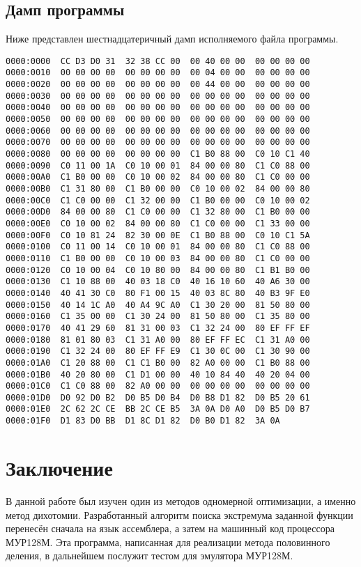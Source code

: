 \documentclass[14pt]{report}
\begin{document}
\section{Дамп программы}
Ниже представлен шестнадцатеричный дамп исполняемого файла программы.
\begin{verbatim}
0000:0000  CC D3 D0 31  32 38 CC 00  00 40 00 00  00 00 00 00
0000:0010  00 00 00 00  00 00 00 00  00 04 00 00  00 00 00 00
0000:0020  00 00 00 00  00 00 00 00  00 44 00 00  00 00 00 00
0000:0030  00 00 00 00  00 00 00 00  00 00 00 00  00 00 00 00
0000:0040  00 00 00 00  00 00 00 00  00 00 00 00  00 00 00 00
0000:0050  00 00 00 00  00 00 00 00  00 00 00 00  00 00 00 00
0000:0060  00 00 00 00  00 00 00 00  00 00 00 00  00 00 00 00
0000:0070  00 00 00 00  00 00 00 00  00 00 00 00  00 00 00 00
0000:0080  00 00 00 00  00 00 00 00  C1 B0 88 00  C0 10 C1 40
0000:0090  C0 11 00 1A  C0 10 00 01  84 00 00 80  C1 C0 88 00
0000:00A0  C1 B0 00 00  C0 10 00 02  84 00 00 80  C1 C0 00 00
0000:00B0  C1 31 80 00  C1 B0 00 00  C0 10 00 02  84 00 00 80
0000:00C0  C1 C0 00 00  C1 32 00 00  C1 B0 00 00  C0 10 00 02
0000:00D0  84 00 00 80  C1 C0 00 00  C1 32 80 00  C1 B0 00 00
0000:00E0  C0 10 00 02  84 00 00 80  C1 C0 00 00  C1 33 00 00
0000:00F0  C0 10 81 24  82 30 00 0E  C1 B0 88 00  C0 10 C1 5A
0000:0100  C0 11 00 14  C0 10 00 01  84 00 00 80  C1 C0 88 00
0000:0110  C1 B0 00 00  C0 10 00 03  84 00 00 80  C1 C0 00 00
0000:0120  C0 10 00 04  C0 10 80 00  84 00 00 80  C1 B1 B0 00
0000:0130  C1 10 88 00  40 03 18 C0  40 16 10 60  40 A6 30 00
0000:0140  40 41 30 C0  80 F1 00 15  40 03 8C 80  40 B3 9F E0
0000:0150  40 14 1C A0  40 A4 9C A0  C1 30 20 00  81 50 80 00
0000:0160  C1 35 00 00  C1 30 24 00  81 50 80 00  C1 35 80 00
0000:0170  40 41 29 60  81 31 00 03  C1 32 24 00  80 EF FF EF
0000:0180  81 01 80 03  C1 31 A0 00  80 EF FF EC  C1 31 A0 00
0000:0190  C1 32 24 00  80 EF FF E9  C1 30 0C 00  C1 30 90 00
0000:01A0  C1 20 88 00  C1 C1 B0 00  82 A0 00 00  C1 B0 88 00
0000:01B0  40 20 80 00  C1 D1 00 00  40 10 84 40  40 20 04 00
0000:01C0  C1 C0 88 00  82 A0 00 00  00 00 00 00  00 00 00 00
0000:01D0  D0 92 D0 B2  D0 B5 D0 B4  D0 B8 D1 82  D0 B5 20 61
0000:01E0  2C 62 2C CE  BB 2C CE B5  3A 0A D0 A0  D0 B5 D0 B7
0000:01F0  D1 83 D0 BB  D1 8C D1 82  D0 B0 D1 82  3A 0A
\end{verbatim}
\chapter*{Заключение}
В данной работе был изучен один из методов одномерной оптимизации, а именно метод дихотомии. Разработанный алгоритм поиска экстремума заданной функции перенесён сначала на язык ассемблера, а затем на машинный код процессора МУР128М. Эта программа, написанная для реализации метода половинного деления, в дальнейшем послужит тестом для эмулятора МУР128М.
\end{document}
